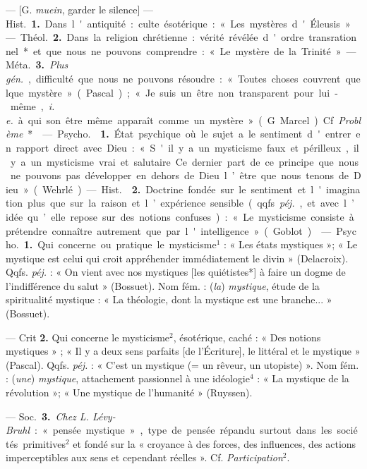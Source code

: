 \begin{itemize}[leftmargin=1cm, label=, itemsep=1pt]
 — [G. {\it muein}, garder le silence] — \si{Hist.} {\bf 1.} Dans
l'antiquité : culte ésotérique : « Les mystères d'Éleusis ». — \si{Théol.}
{\bf 2.} Dans la religion
chrétienne : vérité révélée d'ordre transrationnel* et que nous ne pouvons
comprendre : « Le mystère de la Trinité ». — \si{Méta.} {\bf 3.} {\it Plus
gén.}, difficulté que nous ne pouvons résoudre : « Toutes choses couvrent
quelque mystère » (Pascal) ; « Je suis un être non transparent pour lui-même,
{\it i. e.} à qui son être même apparaît comme un mystère » (G. Marcel). Cf.
{\it Problème}*.

 — \si{Psycho.}  {\bf 1.} État psychique où le
sujet a le sentiment d'entrer en rapport direct avec Dieu : « S'il y a un
mysticisme faux et périlleux, il y a un mysticisme vrai et salutaire. Ce
dernier part de ce principe que nous ne pouvons pas développer en dehors de
Dieu l’être que nous tenons de Dieu » (Wehrlé).

— \si{Hist.}  {\bf 2.} Doctrine fondée sur le sentiment et
l'imagination plus que sur la raison et l’expérience sensible (qqfs.
{\it péj.}, et avec l’idée qu’elle repose sur des notions confuses) : « Le
mysticisme consiste à prétendre connaître autrement que par
l'intelligence » (Goblot).

 — \si{Psycho.} {\bf 1.} Qui concerne ou pratique le
mysticisme$^1$ : « Les états mystiques »; « Le mystique est celui qui croit
appréhender immédiatement le divin » (Delacroix). Qqfs. {\it péj.} : « On
vient avec nos mystiques [les quiétistes*] à faire un dogme de l'indifférence
du salut » (Bossuet). Nom fém. : ({\it la}) {\it mystique}, étude de la
spiritualité mystique : « La théologie, dont la mystique est une
branche... » (Bossuet).

— Crit {\bf 2.} Qui concerne le mysticisme$^2$, ésotérique, caché : « Des
notions mystiques » ; « Il y a deux sens parfaits [de l'Écriture], le
littéral et le mystique » (Pascal). Qqfs. {\it péj.} : « C'est un mystique
(= un rêveur, un utopiste) ». Nom
fém. : ({\it une}) {\it mystique}, attachement passionnel à une
idéologie$^4$ : « La mystique de la révolution »; « Une mystique de
l'humanité » (Ruyssen).

— \si{Soc.} {\bf 3.} {\it Chez L. Lévy-Bruhl} : « pensée mystique », type de
pensée répandu surtout dans les sociétés primitives$^2$ et fondé sur la
« croyance à des forces, des influences, des actions imperceptibles aux sens
et cependant réelles ». Cf. {\it Participation}$^2$.


\end{itemize}
